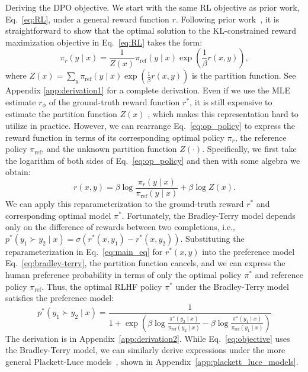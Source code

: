 \documentclass{article}
\begin{document}
Deriving the DPO objective. We start with the same RL objective as prior work, Eq.~\ref{eq:RL}, under a general reward function $r$. Following prior work~\citep{peters2007reinforcement, peng2019advantage, korbak2022reinforcement, go2023aligning}, it is straightforward to show that the optimal solution to the KL-constrained reward maximization objective in Eq.~\ref{eq:RL} takes the form:
\begin{equation}\label{eq:op_policy}
    \pi_r(y\mid x) = \frac{1}{Z(x)}\pi_\text{ref}(y\mid x)\exp\left(\frac{1}{\beta}r(x, y)\right),
\end{equation}%
where $Z(x) =\sum_{y}\pi_\text{ref}(y\mid x)\exp\left(\frac{1}{\beta}r(x, y)\right)$ is the partition function. See Appendix \ref{app:derivation1} for a complete derivation. Even if we use the MLE estimate $r_{\phi}$ of the ground-truth reward function $r^*$, it is still expensive to estimate the partition function $Z(x)$ \citep{korbak2022reinforcement, go2023aligning}, which makes this representation hard to utilize in practice. However, we can rearrange Eq.~\ref{eq:op_policy} to express the reward function in terms of its corresponding optimal policy $\pi_r$, the reference policy $\pi_\text{ref}$, and the unknown partition function $Z(\cdot)$. Specifically, we first take the logarithm of both sides of Eq.~\ref{eq:op_policy} and then with some algebra we obtain:
\begin{equation}\label{eq:main_eq}
    r(x,y) =\beta \log \frac{\pi_r(y\mid x)}{\pi_\text{ref}(y\mid x)} + \beta \log Z(x).
\end{equation}
We can apply this reparameterization to the ground-truth reward $r^*$ and corresponding optimal model $\pi^*$. Fortunately, the Bradley-Terry model depends only on the difference of rewards between two completions, i.e., ${p^*(y_1 \succ y_2 \mid x) = \sigma(r^*(x, y_1) - r^*(x, y_2))}$. Substituting the reparameterization in Eq.~\ref{eq:main_eq} for $r^*(x,y)$ into the preference model Eq.~\ref{eq:bradley-terry}, the partition function cancels, and we can express the human preference probability in terms of only the optimal policy $\pi^*$ and reference policy $\pi_\text{ref}$. Thus, the optimal RLHF policy $\pi^*$ under the Bradley-Terry model satisfies the preference model:
\begin{equation}\label{eq:objective}
    p^*(y_1\succ y_2 \mid x)=\frac{1}{1 + \exp\left(\beta \log \frac{\pi^*(y_2\mid x)}{\pi_\text{ref}(y_2\mid x)} - \beta \log \frac{\pi^*(y_1\mid x)}{\pi_\text{ref}(y_1\mid x)}\right)}
\end{equation}
The derivation is in Appendix~\ref{app:derivation2}. While Eq.~\ref{eq:objective} uses the Bradley-Terry model, we can similarly derive expressions under the more general Plackett-Luce models~\citep{plackett1975analysis, luce2012individual}, shown in Appendix~\ref{app:plackett_luce_models}.
\end{document}
